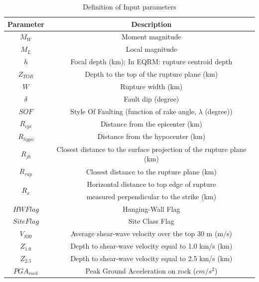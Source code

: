 \begin{table}[!t]
\renewcommand{\arraystretch}{1.3}
\caption{Definition of Input parameters} \label{def} \centering
\begin{tabular}{|c|c|}
\hline Parameter& Description\\
\hline $M_W$ & {\small Moment magnitude}\\

\hline $M_L$ & {\small Local magnitude}\\

\hline $h$ & {\small Focal depth (km); In EQRM: rupture centroid depth}\\

\hline $Z_{TOR}$ & {\small Depth to the top of the rupture plane (km)}\\

\hline $W$ & {\small Rupture width (km)}\\

\hline $\delta$ & {\small Fault dip (degree)}\\

\hline $SOF$ & {\small Style Of Faulting (function of rake angle,
$\lambda$
(degree))}\\

\hline $R_{epi}$ & {\small Distance from the epicenter (km)}\\

\hline $R_{hypo}$ & {\small Distance from the hypocenter (km)}\\

\hline $R_{jb}$ & {\small Closest distance to the surface projection
of the
rupture plane (km)}\\

\hline $R_{rup}$ & {\small Closest distance to the rupture plane (km)}\\

\hline \multirow{2}{*}{$R_x$} & {\small Horizontal distance to top edge of rupture}\\
 &{\small measured
perpendicular to the strike (km)}\\

\hline $HW Flag$ & {\small Hanging-Wall Flag}\\

\hline $Site Flag$ & {\small Site Class Flag}\\

\hline $V_{S30}$ & {\small Average shear-wave velocity over the top 30 m (m/s)}\\

\hline $Z_{1.0}$ & {\small Depth to shear-wave velocity equal to 1.0
km/s
(km)}\\

\hline $Z_{2.5}$ & {\small Depth to shear-wave velocity equal to 2.5
km/s
(km)}\\

\hline $PGA_{rock}$ &{\small Peak Ground Acceleration on rock ($cm/s^2$)}\\
\hline

\end{tabular}
\end{table}





